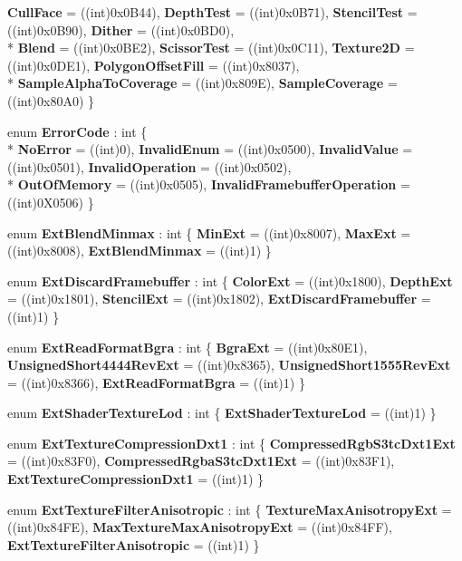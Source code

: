 \begin{DoxyCompactItemize}
{\bfseries Cull\-Face} = ((int)0x0\-B44), 
{\bfseries Depth\-Test} = ((int)0x0\-B71), 
{\bfseries Stencil\-Test} = ((int)0x0\-B90), 
{\bfseries Dither} = ((int)0x0\-B\-D0), 
\\*
{\bfseries Blend} = ((int)0x0\-B\-E2), 
{\bfseries Scissor\-Test} = ((int)0x0\-C11), 
{\bfseries Texture2\-D} = ((int)0x0\-D\-E1), 
{\bfseries Polygon\-Offset\-Fill} = ((int)0x8037), 
\\*
{\bfseries Sample\-Alpha\-To\-Coverage} = ((int)0x809\-E), 
{\bfseries Sample\-Coverage} = ((int)0x80\-A0)
 \}
\item 
enum {\bfseries Error\-Code} \-: int \{ \\*
{\bfseries No\-Error} = ((int)0), 
{\bfseries Invalid\-Enum} = ((int)0x0500), 
{\bfseries Invalid\-Value} = ((int)0x0501), 
{\bfseries Invalid\-Operation} = ((int)0x0502), 
\\*
{\bfseries Out\-Of\-Memory} = ((int)0x0505), 
{\bfseries Invalid\-Framebuffer\-Operation} = ((int)0\-X0506)
 \}
\item 
enum {\bfseries Ext\-Blend\-Minmax} \-: int \{ {\bfseries Min\-Ext} = ((int)0x8007), 
{\bfseries Max\-Ext} = ((int)0x8008), 
{\bfseries Ext\-Blend\-Minmax} = ((int)1)
 \}
\item 
enum {\bfseries Ext\-Discard\-Framebuffer} \-: int \{ {\bfseries Color\-Ext} = ((int)0x1800), 
{\bfseries Depth\-Ext} = ((int)0x1801), 
{\bfseries Stencil\-Ext} = ((int)0x1802), 
{\bfseries Ext\-Discard\-Framebuffer} = ((int)1)
 \}
\item 
enum {\bfseries Ext\-Read\-Format\-Bgra} \-: int \{ {\bfseries Bgra\-Ext} = ((int)0x80\-E1), 
{\bfseries Unsigned\-Short4444\-Rev\-Ext} = ((int)0x8365), 
{\bfseries Unsigned\-Short1555\-Rev\-Ext} = ((int)0x8366), 
{\bfseries Ext\-Read\-Format\-Bgra} = ((int)1)
 \}
\item 
enum {\bfseries Ext\-Shader\-Texture\-Lod} \-: int \{ {\bfseries Ext\-Shader\-Texture\-Lod} = ((int)1)
 \}
\item 
enum {\bfseries Ext\-Texture\-Compression\-Dxt1} \-: int \{ {\bfseries Compressed\-Rgb\-S3tc\-Dxt1\-Ext} = ((int)0x83\-F0), 
{\bfseries Compressed\-Rgba\-S3tc\-Dxt1\-Ext} = ((int)0x83\-F1), 
{\bfseries Ext\-Texture\-Compression\-Dxt1} = ((int)1)
 \}
\item 
enum {\bfseries Ext\-Texture\-Filter\-Anisotropic} \-: int \{ {\bfseries Texture\-Max\-Anisotropy\-Ext} = ((int)0x84\-F\-E), 
{\bfseries Max\-Texture\-Max\-Anisotropy\-Ext} = ((int)0x84\-F\-F), 
{\bfseries Ext\-Texture\-Filter\-Anisotropic} = ((int)1)
 \}
\item 

\end{DoxyCompactItemize}
